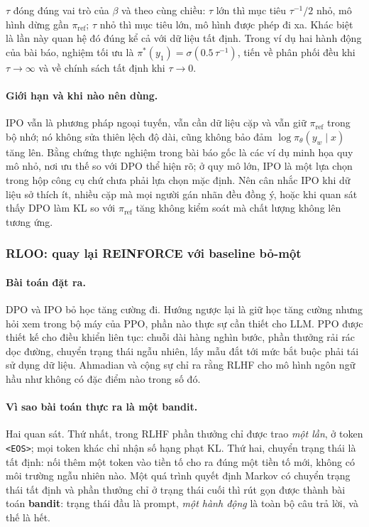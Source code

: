 \( \tau \) đóng đúng vai trò của \( \beta \) và theo cùng chiều: \( \tau \) lớn thì mục tiêu \( \tau^{-1}/2 \) nhỏ, mô hình dừng gần \( \pi_{\text{ref}} \); \( \tau \) nhỏ thì mục tiêu lớn, mô hình được phép đi xa. Khác biệt là lần này quan hệ đó đúng kể cả với dữ liệu tất định. Trong ví dụ hai hành động của bài báo, nghiệm tối ưu là \( \pi^{*}(y_1) = \sigma(0.5\,\tau^{-1}) \), tiến về phân phối đều khi \( \tau \to \infty \) và về chính sách tất định khi \( \tau \to 0 \).

\paragraph{Giới hạn và khi nào nên dùng.}
IPO vẫn là phương pháp ngoại tuyến, vẫn cần dữ liệu cặp và vẫn giữ \( \pi_{\text{ref}} \) trong bộ nhớ; nó không sửa thiên lệch độ dài, cũng không bảo đảm \( \log\pi_{\theta}(y_w \mid x) \) tăng lên. Bằng chứng thực nghiệm trong bài báo gốc là các ví dụ minh họa quy mô nhỏ, nơi ưu thế so với DPO thể hiện rõ; ở quy mô lớn, IPO là một lựa chọn trong hộp công cụ chứ chưa phải lựa chọn mặc định. Nên cân nhắc IPO khi dữ liệu sở thích ít, nhiều cặp mà mọi người gán nhãn đều đồng ý, hoặc khi quan sát thấy DPO làm KL so với \( \pi_{\text{ref}} \) tăng không kiểm soát mà chất lượng không lên tương ứng.

\subsubsection{RLOO: quay lại REINFORCE với baseline bỏ-một}
\label{ssec:rloo}

\paragraph{Bài toán đặt ra.}
DPO và IPO bỏ học tăng cường đi. Hướng ngược lại là giữ học tăng cường nhưng hỏi xem trong bộ máy của PPO, phần nào thực sự cần thiết cho LLM. PPO được thiết kế cho điều khiển liên tục: chuỗi dài hàng nghìn bước, phần thưởng rải rác dọc đường, chuyển trạng thái ngẫu nhiên, lấy mẫu đắt tới mức bắt buộc phải tái sử dụng dữ liệu. Ahmadian và cộng sự \cite{ahmadian2024rloo} chỉ ra rằng RLHF cho mô hình ngôn ngữ hầu như không có đặc điểm nào trong số đó.

\paragraph{Vì sao bài toán thực ra là một bandit.}
Hai quan sát. Thứ nhất, trong RLHF phần thưởng chỉ được trao \emph{một lần}, ở token \texttt{<EOS>}; mọi token khác chỉ nhận số hạng phạt KL. Thứ hai, chuyển trạng thái là tất định: nối thêm một token vào tiền tố cho ra đúng một tiền tố mới, không có môi trường ngẫu nhiên nào. Một quá trình quyết định Markov có chuyển trạng thái tất định và phần thưởng chỉ ở trạng thái cuối thì rút gọn được thành bài toán \textbf{bandit}: trạng thái đầu là prompt, \emph{một hành động} là toàn bộ câu trả lời, và thế là hết.

